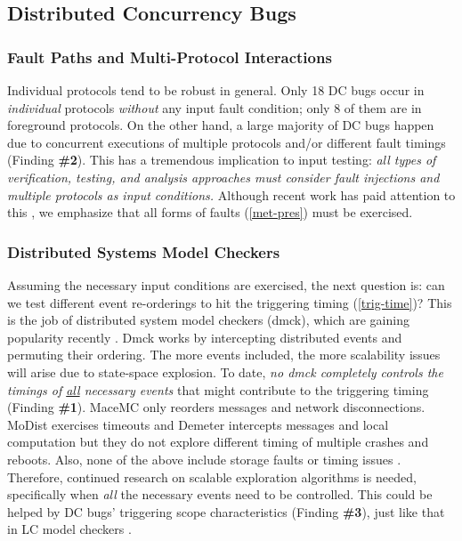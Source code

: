 \subsection{Distributed Concurrency Bugs}
\subsubsection{Fault Paths and Multi-Protocol Interactions}
\label{less-fault}

Individual protocols tend to be robust in general.  Only 18 DC bugs
occur in {\em individual} protocols {\em without} any input 
fault condition; only
8 of them are in foreground protocols.  On the other hand, a large
majority of DC bugs happen due to concurrent executions of multiple
protocols and/or different fault timings (Finding {\bf \#2}).
%
This has a tremendous implication to input testing: {\em all types of
  verification, testing, and analysis approaches must consider fault
  injections and multiple protocols as input conditions.}
%
Although recent work has paid attention to this
\cite{Gunawi+11-FateDestini, Joshi+11-PreFail, 
Yuan+14-SimpleTesting}, we emphasize
that all forms of faults (\sec\ref{met-pres}) must be exercised.


\subsubsection{Distributed Systems Model Checkers}
\label{less-dmck}

Assuming the necessary input conditions are exercised, the next
question is: can we test different event re-orderings to hit the
triggering timing (\sec\ref{trig-time})?  This is the job of
distributed system model checkers (dmck), which are gaining popularity
recently \cite{Guo+11-Demeter, 
Killian+07-LifeDeathMaceMC,
  Simsa+10-Dbug,
  Yang+09-Modist}.  Dmck works by intercepting distributed events and
permuting their ordering.  The more events included, the more
scalability issues will arise due to state-space explosion.
%
To date, {\em no dmck completely controls the timings of
  \underline{all} necessary events} that might contribute to the
triggering timing (Finding {\bf \#1}).  MaceMC
\cite{Killian+07-LifeDeathMaceMC} only reorders messages and network
disconnections.  MoDist \cite{Guo+11-Demeter} exercises timeouts and
Demeter \cite{Guo+11-Demeter} intercepts messages and local
computation but they do not explore different timing of multiple
crashes and reboots. Also, none of the above include storage faults
or timing issues \cite{Hao+16-TailAtStore}.
%
Therefore, continued research on scalable exploration algorithms is
needed, specifically 
when {\em all} the necessary events need to be controlled.
This could be helped by DC bugs' triggering scope characteristics
(Finding {\bf \#3}), just like that in
LC model checkers \cite{madanpldi07}.


